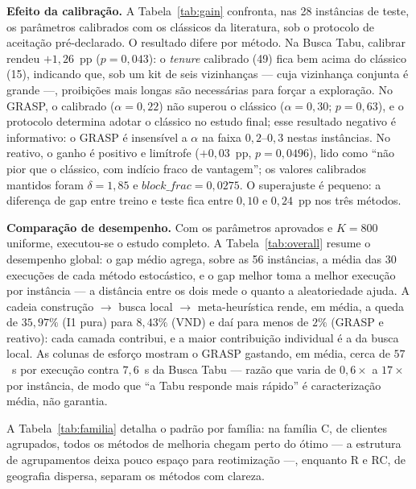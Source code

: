 \documentclass[10pt,a4paper]{article}
\begin{document}
\textbf{Efeito da calibração.} A Tabela~\ref{tab:gain} confronta, nas 28 instâncias de teste, os parâmetros calibrados com os clássicos da literatura, sob o protocolo de aceitação pré-declarado. O resultado difere por método. Na Busca Tabu, calibrar rendeu $+1{,}26$~pp ($p=0{,}043$): o \textit{tenure} calibrado (49) fica bem acima do clássico (15), indicando que, sob um kit de seis vizinhanças --- cuja vizinhança conjunta é grande ---, proibições mais longas são necessárias para forçar a exploração. No GRASP, o calibrado ($\alpha=0{,}22$) não superou o clássico ($\alpha=0{,}30$; $p=0{,}63$), e o protocolo determina adotar o clássico no estudo final; esse resultado negativo é informativo: o GRASP é insensível a $\alpha$ na faixa $0{,}2$--$0{,}3$ nestas instâncias. No reativo, o ganho é positivo e limítrofe ($+0{,}03$~pp, $p=0{,}0496$), lido como ``não pior que o clássico, com indício fraco de vantagem''; os valores calibrados mantidos foram $\delta=1{,}85$ e $\mathit{block\_frac}=0{,}0275$. O superajuste é pequeno: a diferença de gap entre treino e teste fica entre $0{,}10$ e $0{,}24$~pp nos três métodos.



\textbf{Comparação de desempenho.} Com os parâmetros aprovados e $K=800$ uniforme, executou-se o estudo completo. A Tabela~\ref{tab:overall} resume o desempenho global: o gap médio agrega, sobre as 56 instâncias, a média das 30 execuções de cada método estocástico, e o gap melhor toma a melhor execução por instância --- a distância entre os dois mede o quanto a aleatoriedade ajuda. A cadeia construção $\rightarrow$ busca local $\rightarrow$ meta-heurística rende, em média, a queda de $35{,}97\%$ (I1 pura) para $8{,}43\%$ (VND) e daí para menos de $2\%$ (GRASP e reativo): cada camada contribui, e a maior contribuição individual é a da busca local. As colunas de esforço mostram o GRASP gastando, em média, cerca de $57$~s por execução contra $7{,}6$~s da Busca Tabu --- razão que varia de $0{,}6\times$ a $17\times$ por instância, de modo que ``a Tabu responde mais rápido'' é caracterização média, não garantia.



A Tabela~\ref{tab:familia} detalha o padrão por família: na família C, de clientes agrupados, todos os métodos de melhoria chegam perto do ótimo --- a estrutura de agrupamentos deixa pouco espaço para reotimização ---, enquanto R e RC, de geografia dispersa, separam os métodos com clareza.


\end{document}
